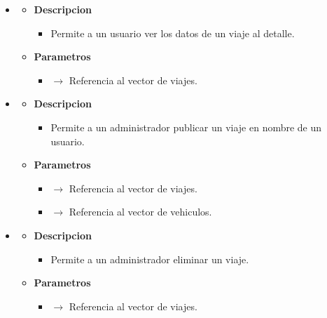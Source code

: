 \begin{itemize}
\begin{itemize}
\begin{itemize}
		\end{itemize}
	\end{itemize}
    \item \label{def:detallavi}
    \begin{itemize}
        \item \textbf{Descripcion}
        \begin{itemize}
			\item  Permite a un usuario ver los datos de un viaje al detalle.
		\end{itemize}
		\item \textbf{Parametros}
		\begin{itemize}
			\item {}  $\rightarrow$ Referencia al vector de viajes.
		\end{itemize}
	\end{itemize}
    \newpage
    \item \label{def:puviadmin}
    \begin{itemize}
        \item \textbf{Descripcion}
        \begin{itemize}
			\item Permite a un administrador publicar un viaje en nombre de un usuario.
		\end{itemize}
		\item \textbf{Parametros}
		\begin{itemize}
			\item {}  $\rightarrow$ Referencia al vector de viajes.
            \item {} $\rightarrow$ Referencia al vector de vehiculos.
		\end{itemize}
	\end{itemize}
    \item \label{def:delviadmin}
    \begin{itemize}
        \item \textbf{Descripcion}
        \begin{itemize}
			\item  Permite a un administrador eliminar un viaje.
		\end{itemize}
		\item \textbf{Parametros}
		\begin{itemize}
			\item {}  $\rightarrow$ Referencia al vector de viajes.
		\end{itemize}

\end{itemize}
\end{itemize}
